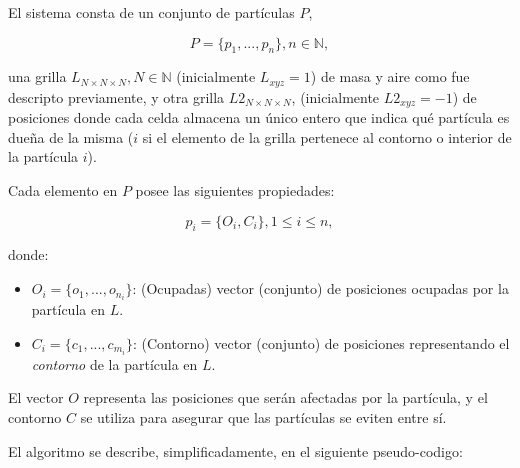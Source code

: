 \documentclass[spanish,a4paper,openright,11pt]{book}
\begin{document}
El sistema consta de un conjunto de part\'iculas $P$,

\begin{equation}
  P = \{p_{1}, ... , p_{n}\}, n  \in \mathbb{N},
\end{equation}

\noindent una grilla $L_{N\times N \times N}, N \in \mathbb{N} $ (inicialmente $L_{xyz}=1$) de masa y aire como fue descripto previamente, y otra grilla $L2_{N\times N \times N}$, (inicialmente $L2_{xyz}=-1$) de posiciones donde cada celda almacena un único entero que indica qu\'e part\'icula es due\~na de la misma ($i$ si el elemento de la grilla pertenece al contorno o interior de la part\'icula $i$).

Cada elemento en $P$ posee las siguientes propiedades:

\begin{equation}
  p_{i} = \{O_{i}, C_{i}\}, 1 \le i \le n,
\end{equation}

\noindent donde:

\begin{itemize}
\item $O_{i} = \{o_{1}, ... , o_{n_{i}}\}$: (Ocupadas) vector (conjunto) de posiciones ocupadas por la part\'icula en $L$.

\item $C_{i} = \{c_{1}, ... , c_{m_{i}}\}$: (Contorno) vector (conjunto) de posiciones representando el {\em contorno} de la part\'icula en $L$.
\end{itemize}

El vector $O$ representa las posiciones que ser\'an afectadas por la part\'icula, y el contorno $C$ se utiliza para asegurar que las part\'iculas se eviten entre s\'i.

El algoritmo se describe, simplificadamente, en el siguiente pseudo-codigo: 
\end{document}
